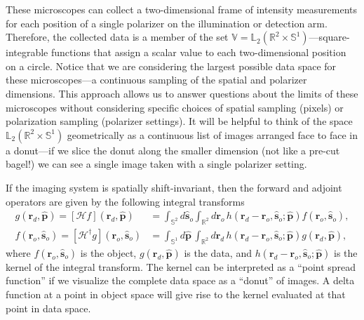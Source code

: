 \documentclass[11pt]{article}
\providecommand{\mb}[1]{\mathbf{#1}}
\providecommand{\ro}[1]{\mathbf{\mathbf{r}}_o}
\providecommand{\so}[1]{\mathbf{\hat{s}}_o}
\providecommand{\rd}[1]{\mathbf{r}_d}
\providecommand{\mh}[1]{\mathbf{\hat{#1}}}
\providecommand{\mbb}[1]{\mathbb{#1}}
\begin{document}
These microscopes can collect a two-dimensional frame of intensity measurements
for each position of a single polarizer on the illumination or detection arm.
Therefore, the collected data is a member of the set
$\mbb{V} = \mbb{L}_2(\mbb{R}^2 \times \mbb{S}^1)$---square-integrable functions
that assign a scalar value to each two-dimensional position on a circle. Notice
that we are considering the largest possible data space for these
microscopes---a continuous sampling of the spatial and polarizer dimensions.
This approach allows us to answer questions about the limits of these
microscopes without considering specific choices of spatial sampling (pixels) or
polarization sampling (polarizer settings). It will be helpful to think of the
space $\mbb{L}_2(\mbb{R}^2 \times \mbb{S}^1)$ geometrically as a continuous list
of images arranged face to face in a donut---if we slice the donut along the
smaller dimension (not like a pre-cut bagel!) we can see a single
image taken with a single polarizer setting.

If the imaging system is spatially shift-invariant, then the forward and adjoint operators are given by the following integral transforms
\begin{align}
  g(\rd{}, \mh{p}) = [\mathcal{H}f](\rd{}, \hat{\mb{p}}) &= \int_{\mbb{S}^2}d\so{}\int_{\mbb{R}^2}d\ro{}\, h(\rd{} -\ro{}, \so{}; \hat{\mb{p}})f(\ro{}, \so{}),\\
  f(\ro{}, \so{}) =  [\mathcal{H}^{\dagger}g](\ro{}, \so{}) &= \int_{\mbb{S}^1}d\hat{\mb{p}}\, \int_{\mbb{R}^2}d\mb{r}_{d}\, h(\rd{} - \ro{}, \so{}; \hat{\mb{p}})g(\rd{}, \hat{\mb{p}}),
\end{align}
where $f(\ro{}, \so{})$ is the object, $g(\rd{}, \hat{\mb{p}})$ is the data, and
$h(\rd{} -\ro{}, \so{}; \hat{\mb{p}})$ is the kernel of the integral transform.
The kernel can be interpreted as a ``point spread function'' if we visualize the
complete data space as a ``donut'' of images. A delta function at a point in object
space will give rise to the kernel evaluated at that point in data space.
\end{document}

